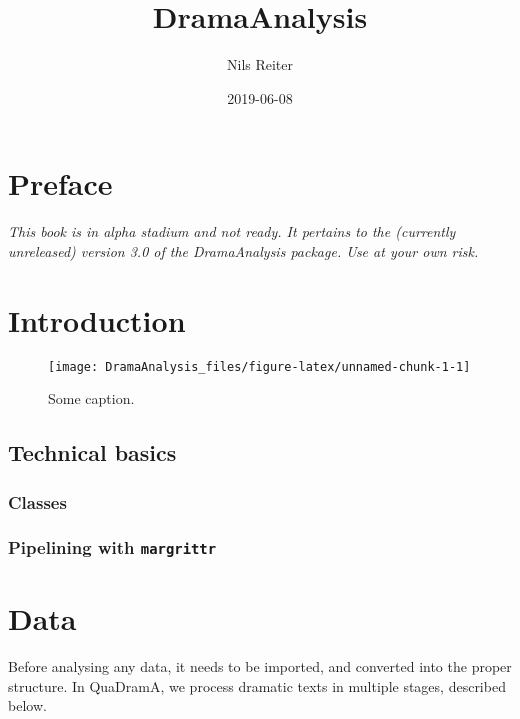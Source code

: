 \documentclass[]{book}
\title{DramaAnalysis}
\author{Nils Reiter}
\date{2019-06-08}
\begin{document}
\maketitle

{
\setcounter{tocdepth}{1}
\tableofcontents
}
\hypertarget{preface}{%
\chapter*{Preface}\label{preface}}

\emph{This book is in alpha stadium and not ready. It pertains to the (currently unreleased) version 3.0 of the DramaAnalysis package. Use at your own risk.}

\hypertarget{introduction}{%
\chapter{Introduction}\label{introduction}}

\begin{figure}
\texttt{[image: DramaAnalysis\_files/figure-latex/unnamed-chunk-1-1]} \caption{Some caption.}\label{fig:unnamed-chunk-1}
\end{figure}

\hypertarget{technical-basics}{%
\section{Technical basics}\label{technical-basics}}

\hypertarget{classes}{%
\subsection{Classes}\label{classes}}

\hypertarget{pipelining-with-margrittr}{%
\subsection{\texorpdfstring{Pipelining with \texttt{margrittr}}{Pipelining with margrittr}}\label{pipelining-with-margrittr}}

\hypertarget{data}{%
\chapter{Data}\label{data}}

Before analysing any data, it needs to be imported, and converted into the proper structure. In QuaDramA, we process dramatic texts in multiple stages, described below.
\end{document}
